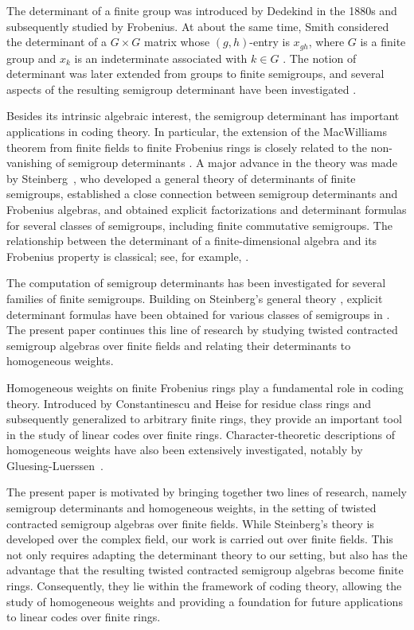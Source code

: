 \documentclass[11pt,reqno]{amsart}
\theoremstyle{plain}
\theoremstyle{remark}
\theoremstyle{definition}
\begin{document}
The determinant of a finite group was introduced by Dedekind in the 1880s and
subsequently studied by Frobenius. At about the same time, Smith considered the
determinant of a \(G\times G\) matrix whose \((g,h)\)-entry is \(x_{gh}\), where
\(G\) is a finite group and \(x_k\) is an indeterminate associated with
\(k\in G\) \cite{Smith}. The notion of determinant was later extended from
groups to finite semigroups, and several aspects of the resulting semigroup
determinant have been investigated
\cite{Lindstr,Wilf,Wood}.

Besides its intrinsic algebraic interest, the semigroup determinant has important applications in coding theory. In particular, the extension of the MacWilliams theorem from finite fields to finite Frobenius rings is closely related to the non-vanishing of semigroup determinants \cite{Wood-Duality}. A major advance in the theory was made by Steinberg~\cite{Ste-Fac-det}, who developed a general theory of determinants of finite semigroups, established a close connection between semigroup determinants and Frobenius algebras, and obtained explicit factorizations and determinant formulas for several classes of semigroups, including finite commutative semigroups.
The relationship between the determinant of a finite-dimensional algebra and its Frobenius property is classical; see, for example, \cite[Chapter~16]{Okn}.

The computation of semigroup determinants has been investigated for several
families of finite semigroups. Building on Steinberg's general theory
\cite{Ste-Fac-det}, explicit determinant formulas have been obtained for
various classes of semigroups in
\cite{Sha-Det,Sha-Det2,Sha-Det3,Sha-Det4}. The present paper continues this line of
research by studying twisted contracted semigroup algebras over finite fields
and relating their determinants to homogeneous weights.

Homogeneous weights on finite Frobenius rings play a fundamental role in coding
theory. Introduced by Constantinescu and Heise for residue class rings and
subsequently generalized to arbitrary finite rings, they provide an important
tool in the study of linear codes over finite rings. Character-theoretic
descriptions of homogeneous weights have also been extensively investigated,
notably by Gluesing-Luerssen~\cite{Gluesing-Luerssen2016}.

The present paper is motivated by bringing together two lines of research,
namely semigroup determinants and homogeneous weights, in the setting of
twisted contracted semigroup algebras over finite fields. While
Steinberg's theory is developed over the complex field, our work is carried out
over finite fields. This not only requires adapting the determinant theory to
our setting, but also has the advantage that the resulting twisted contracted
semigroup algebras become finite rings. Consequently, they lie within the
framework of coding theory, allowing the study of homogeneous weights and
providing a foundation for future applications to linear codes over finite
rings.
\end{document}
